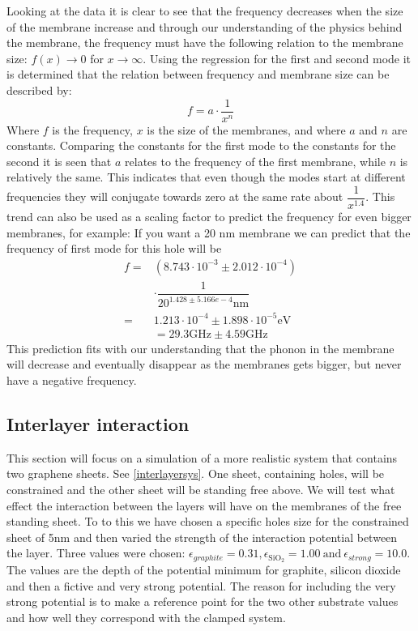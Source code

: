 Looking at the data it is clear to see that the frequency decreases when the size of the membrane increase and through our understanding of the physics behind the membrane, the frequency must have the following relation to the membrane size: $f(x)\rightarrow0$ for $x\rightarrow\infty$. Using the regression for the first and second mode it is determined that the relation between frequency and membrane size can be described by:\begin{equation}
    f=a\cdot\dfrac{1}{x^n}
\end{equation}Where $f$ is the frequency, $x$ is the size of the membranes, and where $a$ and $n$ are constants. Comparing the constants for the first mode to the constants for the second it is seen that $a$ relates to the frequency of the first membrane, while $n$ is relatively the same. This indicates that even though the modes start at different frequencies they will conjugate towards zero at the same rate about $\dfrac{1}{x^{1.4}}$. This trend can also be used as a scaling factor to predict the frequency for even bigger membranes, for example: If you want a 20 nm membrane we can predict that the frequency of first mode for this hole will be
    \begin{align}
     f = & \left(8.743\cdot10^{-3}\pm2.012\cdot10^{-4}\right)\nonumber\\
    & \cdot\dfrac{1}{20^{1.428\pm5.166e-4}\text{nm}}\nonumber\\
    = & 1.213\cdot10^{-4}\pm 1.898\cdot 10^{-5} \mathrm{eV}\nonumber\\
    & =29.3\text{GHz}\pm 4.59\text{GHz}
    \end{align}
This prediction fits with our understanding that the phonon in the membrane will decrease and eventually disappear as the membranes gets bigger, but never have a negative frequency.

\subsection{Interlayer interaction}
This section will focus on a simulation of a more realistic system that contains two graphene sheets. See \cref{interlayersys}. One sheet, containing holes, will be constrained and the other sheet will be standing free above. We will test what effect the interaction between the layers will have on the membranes of the free standing sheet. To to this we have chosen a specific holes size for the constrained sheet of 5nm and then varied the strength of the interaction potential between the layer. Three values were chosen: $\epsilon_{graphite}=0.31, \epsilon_{\text{SiO}_{2}}=1.00 \ \text{and} \ \epsilon_{strong}=10.0$. The values are the depth of the potential minimum for graphite, silicon dioxide and then a fictive and very strong potential. The reason for including the very strong potential is to make a reference point for the two other substrate values and how well they correspond with the clamped system.
\onecolumngrid

